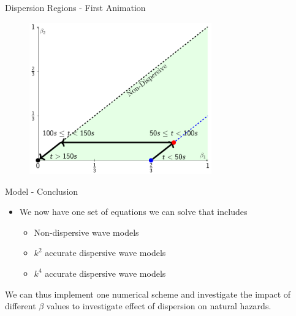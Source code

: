 \documentclass[pdf]{beamer}
\begin{document}
\begin{frame}{Dispersion Regions - First  Animation}
\begin{figure}
	\centering
	\includegraphics[width=0.7\textwidth]{./Pics/Tex/Explanatory/RegionsPlot/BetaPlotAllArrows.pdf}
\end{figure}
\end{frame}

\begin{frame}[plain]{}
\end{frame}



\begin{frame}{Model - Conclusion}
\begin{itemize}
	\item We now have one set of equations we can solve that includes
	\begin{itemize}
		\item Non-dispersive wave models
		\item $k^2$ accurate dispersive wave models
		\item $k^4$ accurate dispersive wave models
	\end{itemize}
\end{itemize}
We can thus implement one numerical scheme and investigate the impact of different $\beta$ values to investigate effect of dispersion on natural hazards. 
\end{frame}
\end{document}
